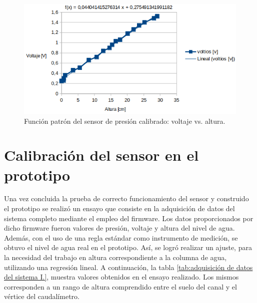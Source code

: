 \begin{figure}[]
	\centering
	\includegraphics[scale=.90]{./Figures/FuncionPatron-Sensor-VoltajeVsAltura.png}
	\caption{Función patrón del sensor de presión calibrado: voltaje vs. altura.}
	\label{fig:Función patrón del sensor de presión calibrado: voltaje vs. altura}
	\end{figure}
\vspace{2cm}	
	
\section{Calibración del sensor en el prototipo
}
\label{sec:Calibración del sensor en el prototipo}
Una vez concluida la prueba de correcto funcionamiento del sensor y construido el prototipo se realizó un ensayo que consiste en la adquisición de datos del sistema completo mediante el empleo del firmware. Los datos proporcionados por dicho firmware fueron valores de presión, voltaje y altura del nivel de agua. Además, con el uso de una regla estándar como instrumento de medición, se obtuvo el nivel de agua real en el prototipo. Así, se logró realizar un ajuste, para la necesidad del trabajo en altura correspondiente a la columna de agua, utilizando una regresión lineal.
A continuación, la tabla \ref{tab:adquisición de datos del sistema I.}, muestra valores obtenidos en el ensayo realizado. Los mismos corresponden a un rango de altura comprendido entre el suelo del canal y el vértice del caudalímetro.

